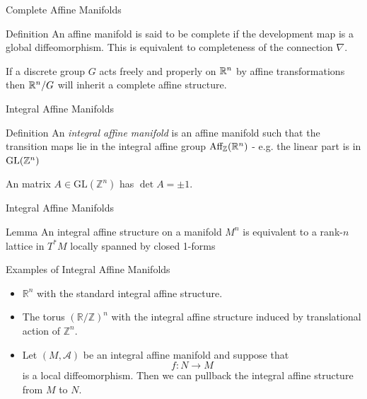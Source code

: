 \begin{frame}[c]{Complete Affine Manifolds}

	\begin{kulblock}{Definition}
		An affine manifold is said to be complete if the development map is a global diffeomorphism. This is equivalent to completeness of the connection $\nabla$.
	\end{kulblock}
	\begin{remark}
		If a discrete group $G$ acts freely and properly on $\mathbb{R}^n$ by affine transformations then $\mathbb{R}^n/G$ will inherit a complete affine structure.
	\end{remark}
\end{frame}

\begin{frame}[c]{Integral Affine Manifolds}

	\begin{kulblock}{Definition}
		An \textit{integral affine manifold} is an affine manifold such that the transition maps lie in the integral affine group $\text{Aff}_{\mathbb{Z}}(\mathbb{R}^n)$ - e.g. the linear part is in $\text{GL}(\mathbb{Z}^n)$
	\end{kulblock}
	\begin{remark}
		An matrix $A \in \text{GL}(\mathbb{Z}^n)$ has $\det A = \pm 1$.
	\end{remark}
\end{frame}

\begin{frame}[c]{Integral Affine Manifolds}

	\begin{kulblock}{Lemma}
		An integral affine structure on a manifold $M^n$ is equivalent to a rank-$n$ lattice in $T^*M$ locally spanned by closed 1-forms
	\end{kulblock}

\end{frame}

\begin{frame}[c]{Examples of Integral Affine Manifolds}

	\begin{itemize}
		\item $\mathbb{R}^n$ with the standard integral affine structure.
		\item The torus $(\mathbb{R}/ \mathbb{Z})^n$ with the integral affine structure
		      induced by translational action of $\mathbb{Z}^n$.
		\item Let $(M, \mathcal{A})$ be an integral affine manifold and suppose that $$f: N
			      \to M$$ is a local diffeomorphism. Then we can pullback the integral affine
		      structure from $M$ to $N$.
	\end{itemize}
\end{frame}


